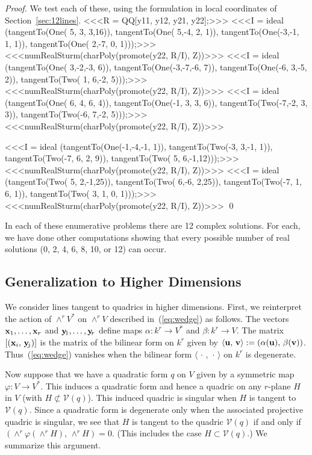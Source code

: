 \begin{proof}
We test each of these, using the formulation in local coordinates of
Section~\ref{sec:12lines}. 
%
<<<R = QQ[y11, y12, y21, y22];>>>
%
<<<I = ideal (tangentTo(One( 5, 3, 3,16)), 
           tangentTo(One( 5,-4, 2, 1)),  
           tangentTo(One(-3,-1, 1, 1)), 
           tangentTo(One( 2,-7, 0, 1)));>>>
%
<<<numRealSturm(charPoly(promote(y22, R/I), Z))>>>
%
<<<I = ideal (tangentTo(One( 3,-2,-3, 6)), 
           tangentTo(One(-3,-7,-6, 7)),  
           tangentTo(One(-6, 3,-5, 2)), 
           tangentTo(Two( 1, 6,-2, 5)));>>>
%
<<<numRealSturm(charPoly(promote(y22, R/I), Z))>>>
%
<<<I = ideal (tangentTo(One( 6, 4, 6, 4)),  
           tangentTo(One(-1, 3, 3, 6)), 
           tangentTo(Two(-7,-2, 3, 3)), 
           tangentTo(Two(-6, 7,-2, 5)));>>>
%
<<<numRealSturm(charPoly(promote(y22, R/I), Z))>>>%

<<<I = ideal (tangentTo(One(-1,-4,-1, 1)),
           tangentTo(Two(-3, 3,-1, 1)),  
           tangentTo(Two(-7, 6, 2, 9)), 
           tangentTo(Two( 5, 6,-1,12)));>>>
%
<<<numRealSturm(charPoly(promote(y22, R/I), Z))>>>
%
<<<I = ideal (tangentTo(Two( 5, 2,-1,25)), 
           tangentTo(Two( 6,-6, 2,25)), 
           tangentTo(Two(-7, 1, 6, 1)), 
           tangentTo(Two( 3, 1, 0, 1)));>>>
%
<<<numRealSturm(charPoly(promote(y22, R/I), Z))>>>
%
\qed
\end{proof}


In each of these enumerative problems there are 12 complex solutions.
For each, we have done other computations  showing that every possible
number of real solutions (0, 2, 4, 6, 8, 10, or 12) can occur.



\subsection{Generalization to Higher Dimensions}
We consider lines tangent to quadrics in higher dimensions.
First, we reinterpret the action of $\wedge^rV^*$ on $\wedge^rV$
described in~(\ref{eq:wedge}) as follows.
The vectors ${\bf x}_1,\ldots,{\bf x}_r$ and ${\bf y}\!_1,\ldots,{\bf y}\!_r$ 
define maps $\alpha\colon k^r\to V^*$ and $\beta\colon k^r\to V$.
The matrix $[({\bf x}_i,\,{\bf y}\!_j)]$ is the matrix of the bilinear form
on $k^r$ given by 
$\langle{\bf u},\,{\bf v}\rangle:= (\alpha({\bf u}),\,\beta({\bf v}))$.
Thus~(\ref{eq:wedge}) vanishes when the bilinear form 
$\langle\,\cdot\,,\,\cdot\,\rangle$ on $k^r$ is degenerate.

Now suppose that we have a quadratic form $q$ on $V$ given by a symmetric map 
$\varphi\colon V\to V^*$.
This induces a quadratic form and hence a quadric on any $r$-plane $H$ in $V$ 
(with $H\not\subset{\mathcal V}(q)$).
This induced quadric is singular when $H$ is tangent to ${\mathcal V}(q)$.
Since a quadratic form is degenerate only when the associated projective
quadric is singular, we see that
$H$ is tangent to the quadric
${\mathcal V}(q)$ if and only if 
$(\wedge^r\varphi(\wedge^rH),\,\wedge^rH)=0$.
(This includes the case $H\subset{\mathcal V}(q)$.)
We summarize this argument.


